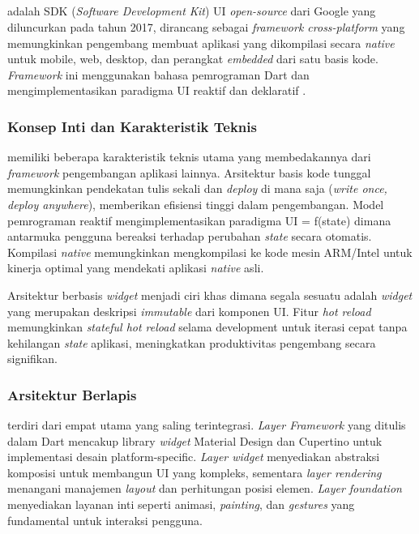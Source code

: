 \subsection{\flutter}
\label{subsec:flutter}

\flutter{} adalah SDK (\emph{Software Development Kit}) UI \emph{open-source} dari Google yang diluncurkan pada tahun 2017, dirancang sebagai \emph{framework cross-platform} yang memungkinkan pengembang membuat aplikasi yang dikompilasi secara \emph{native} untuk mobile, web, desktop, dan perangkat \emph{embedded} dari satu basis kode. \emph{Framework} ini menggunakan bahasa pemrograman Dart dan mengimplementasikan paradigma UI reaktif dan deklaratif \parencite{flutter2021}.

\subsubsection{Konsep Inti dan Karakteristik Teknis}

\flutter memiliki beberapa karakteristik teknis utama yang membedakannya dari \emph{framework} pengembangan aplikasi lainnya. Arsitektur basis kode tunggal memungkinkan pendekatan tulis sekali dan \emph{deploy} di mana saja (\emph{write once, deploy anywhere}), memberikan efisiensi tinggi dalam pengembangan. Model pemrograman reaktif mengimplementasikan paradigma UI = f(state) dimana antarmuka pengguna bereaksi terhadap perubahan \emph{state} secara otomatis. Kompilasi \emph{native} memungkinkan \flutter mengkompilasi ke kode mesin ARM/Intel untuk kinerja optimal yang mendekati aplikasi \emph{native} asli.

Arsitektur berbasis \emph{widget} menjadi ciri khas \flutter dimana segala sesuatu adalah \emph{widget} yang merupakan deskripsi \emph{immutable} dari komponen UI. Fitur \emph{hot reload} memungkinkan \emph{stateful hot reload} selama development untuk iterasi cepat tanpa kehilangan \emph{state} aplikasi, meningkatkan produktivitas pengembang secara signifikan.

\subsubsection{Arsitektur Berlapis}

\flutter terdiri dari empat \layer utama yang saling terintegrasi. \emph{Layer Framework} yang ditulis dalam Dart mencakup library \emph{widget} Material Design dan Cupertino untuk implementasi desain platform-specific. \emph{Layer widget} menyediakan abstraksi komposisi untuk membangun UI yang kompleks, sementara \emph{layer rendering} menangani manajemen \emph{layout} dan perhitungan posisi elemen. \emph{Layer foundation} menyediakan layanan inti seperti animasi, \emph{painting}, dan \emph{gestures} yang fundamental untuk interaksi pengguna.

